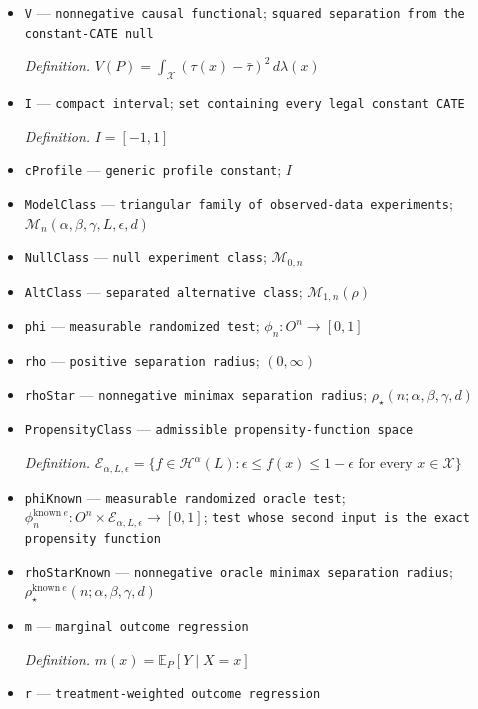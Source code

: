 \documentclass{article}
\begin{document}
\begin{itemize}
  \item \texttt{V} --- \texttt{nonnegative causal functional}; \texttt{squared separation from the constant-\allowbreak{}CATE null}
  \par\smallskip\noindent\emph{Definition.} \(V(P)=\int_{\mathcal X}(\tau(x)-\bar\tau)^2\,d\lambda(x)\)
  \item \texttt{I} --- \texttt{compact interval}; \texttt{set containing every legal constant CATE}
  \par\smallskip\noindent\emph{Definition.} \(I=[-1,1]\)
  \item \texttt{cProfile} --- \texttt{generic profile constant}; \(I\)
  \item \texttt{ModelClass} --- \texttt{triangular family of observed-\allowbreak{}data experiments}; \(\mathcal M_n(\alpha,\beta,\gamma,L,\epsilon,d)\)
  \item \texttt{NullClass} --- \texttt{null experiment class}; \(\mathcal M_{0,n}\)
  \item \texttt{AltClass} --- \texttt{separated alternative class}; \(\mathcal M_{1,n}(\rho)\)
  \item \texttt{phi} --- \texttt{measurable randomized test}; \(\phi_n:O^n\to[0,1]\)
  \item \texttt{rho} --- \texttt{positive separation radius}; \((0,\infty)\)
  \item \texttt{rhoStar} --- \texttt{nonnegative minimax separation radius}; \(\rho_\star(n;\alpha,\beta,\gamma,d)\)
  \item \texttt{PropensityClass} --- \texttt{admissible propensity-\allowbreak{}function space}
  \par\smallskip\noindent\emph{Definition.} \(\mathcal E_{\alpha,L,\epsilon}=\{f\in\mathcal H^\alpha(L):\epsilon\le f(x)\le1-\epsilon\text{ for every }x\in\mathcal X\}\)
  \item \texttt{phiKnown} --- \texttt{measurable randomized oracle test}; \(\phi_n^{\mathrm{known}\ e}:O^n\times\mathcal E_{\alpha,L,\epsilon}\to[0,1]\); \texttt{test whose second input is the exact propensity function}
  \item \texttt{rhoStarKnown} --- \texttt{nonnegative oracle minimax separation radius}; \(\rho_\star^{\mathrm{known}\ e}(n;\alpha,\beta,\gamma,d)\)
  \item \texttt{m} --- \texttt{marginal outcome regression}
  \par\smallskip\noindent\emph{Definition.} \(m(x)=\mathbb E_P[Y\mid X=x]\)
  \item \texttt{r} --- \texttt{treatment-\allowbreak{}weighted outcome regression}

\end{itemize}
\end{document}
